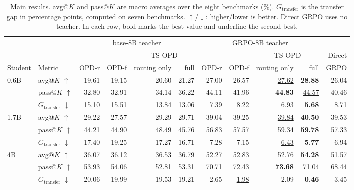 \documentclass[10pt]{article}
\makeatletter
\newcommand{\avgk}{avg@$K$}
\newcommand{\passk}{pass@$K$}
\newcommand{\Gt}{G_{\mathrm{transfer}}}
\makeatother
\begin{document}
\begin{table}[htbp]
\centering
\small
\setlength{\tabcolsep}{3.4pt}
\caption{Main results. \avgk{} and \passk{} are macro averages over the eight
benchmarks (\%). $\Gt$ is the transfer gap in percentage points, computed on
seven benchmarks. $\uparrow$/$\downarrow$: higher/lower is better. Direct GRPO
uses no teacher. In each row, bold marks the best value and underline the second
best.}
\label{tab:main}
\setlength{\aboverulesep}{0pt}\setlength{\belowrulesep}{0pt}\renewcommand{\arraystretch}{1.12}
\begin{tabular}{llrrrrrrrr|r}
\toprule
 & & \multicolumn{4}{c}{base-8B teacher} & \multicolumn{4}{c|}{GRPO-8B teacher} & \\
\cmidrule(lr){3-6}\cmidrule(lr){7-10}
 & & & & \multicolumn{2}{c}{TS-OPD} & & & \multicolumn{2}{c|}{TS-OPD} & Direct \\
\cmidrule(lr){5-6}\cmidrule(lr){9-10}
Student & Metric & OPD-r & OPD-f & routing only & full & OPD-r & OPD-f & routing only & full & GRPO \\
\midrule
0.6B & avg@$K$ $\uparrow$ & 19.61 & 19.15 & 20.60 & 21.27 & 27.00 & 26.57 & \underline{27.62} & \textbf{28.88} & 26.04 \\
 & pass@$K$ $\uparrow$ & 32.80 & 32.91 & 34.14 & 36.22 & 44.11 & 41.96 & \textbf{44.83} & \underline{44.57} & 40.46 \\
 & $G_{\mathrm{transfer}}$ $\downarrow$ & 15.10 & 15.51 & 13.84 & 13.06 & 7.39 & 8.22 & \underline{6.93} & \textbf{5.68} & 8.71 \\
\midrule
1.7B & avg@$K$ $\uparrow$ & 29.22 & 27.57 & 29.29 & 29.71 & 39.04 & 39.25 & \underline{39.84} & \textbf{40.50} & 39.53 \\
 & pass@$K$ $\uparrow$ & 44.21 & 44.90 & 48.49 & 45.76 & 56.83 & 57.57 & \underline{59.34} & \textbf{59.78} & 57.33 \\
 & $G_{\mathrm{transfer}}$ $\downarrow$ & 17.40 & 19.25 & 17.27 & 16.71 & 7.28 & 7.15 & \underline{6.43} & \textbf{5.77} & 6.94 \\
\midrule
4B & avg@$K$ $\uparrow$ & 36.07 & 36.12 & 36.53 & 36.79 & 52.27 & \underline{52.83} & 52.76 & \textbf{54.28} & 51.57 \\
 & pass@$K$ $\uparrow$ & 53.93 & 54.06 & 52.81 & 53.31 & 70.71 & \underline{72.43} & \textbf{73.68} & 71.04 & 68.44 \\
 & $G_{\mathrm{transfer}}$ $\downarrow$ & 20.06 & 19.99 & 19.53 & 19.21 & 2.65 & \underline{1.98} & 2.09 & \textbf{0.46} & 3.45 \\
\bottomrule
\end{tabular}

\end{table}
\end{document}
